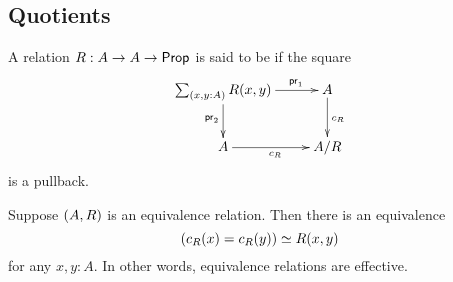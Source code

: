 \documentclass[hott-all.tex]{subfiles}
\begin{document}
\subsection{Quotients}
% 
% 
% 
\begin{defn}
  A relation $R:A\to A\to\mathsf{Prop}$ is said to be 
  if the square
\begin{equation*}
  \xymatrix{
    {\sm{x,y:A} R (x,y)}
    \ar[r]^(0.7){\proj1}
    \ar[d]_{\proj2}
    &
    {A}
    \ar[d]^{c_R}
    \\
    {A}
    \ar[r]_{c_R}
    &
    {A/R}
    }
\end{equation*}
is a pullback.
\end{defn}
% 
% 
\begin{lem}
Suppose ${\mathopen{}(A,R)\mathclose{}}$ is an equivalence relation. Then there is an equivalence
\begin{equation*}
(c_R(x)= c_R(y))\simeq R(x,y)
\end{equation*}
for any $x,y:A$. In other words, equivalence relations are effective.
\end{lem}
% 
\end{document}
